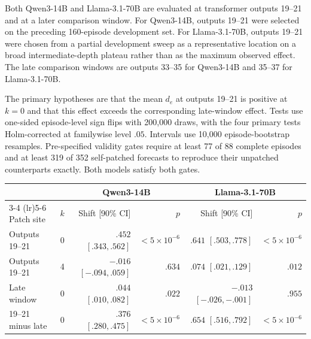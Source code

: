 Both Qwen3-14B and Llama-3.1-70B are evaluated at transformer outputs 19--21 and at a later comparison window.
For Qwen3-14B, outputs 19--21 were selected on the preceding 160-episode development set.
For Llama-3.1-70B, outputs 19--21 were chosen from a partial development sweep as a representative location on a broad intermediate-depth plateau rather than as the maximum observed effect.
The late comparison windows are outputs 33--35 for Qwen3-14B and 35--37 for Llama-3.1-70B.

The primary hypotheses are that the mean \(d_e\) at outputs 19--21 is positive at \(k=0\) and that this effect exceeds the corresponding late-window effect.
Tests use one-sided episode-level sign flips with 200,000 draws, with the four primary tests Holm-corrected at familywise level $.05$.
Intervals use 10,000 episode-bootstrap resamples.
Pre-specified validity gates require at least 77 of 88 complete episodes and at least 319 of 352 self-patched forecasts to reproduce their unpatched counterparts exactly.
Both models satisfy both gates.

\begin{center}
\begin{minipage}{\linewidth}
\centering
{}
\label{tab:coin-city-fixed-window}
\small
\begin{tabular}{l c rr rr}
\toprule
& & \multicolumn{2}{c}{Qwen3-14B} & \multicolumn{2}{c}{Llama-3.1-70B} \\
\cmidrule(lr){3-4}
\cmidrule(lr){5-6}
Patch site & \(k\) & Shift [90\% CI] & \(p\) & Shift [90\% CI] & \(p\) \\
\midrule
Outputs 19--21 & 0 & $.452$ $[.343,.562]$ & \(<5\times10^{-6}\) & $.641$ $[.503,.778]$ & \(<5\times10^{-6}\) \\
Outputs 19--21 & 4 & $-.016$ $[-.094,.059]$ & $.634$ & $.074$ $[.021,.129]$ & $.012$ \\
Late window & 0 & $.044$ $[.010,.082]$ & $.022$ & $-.013$ $[-.026,-.001]$ & $.955$ \\
19--21 minus late & 0 & $.376$ $[.280,.475]$ & \(<5\times10^{-6}\) & $.654$ $[.516,.792]$ & \(<5\times10^{-6}\) \\
\bottomrule
\end{tabular}
\end{minipage}
\end{center}

